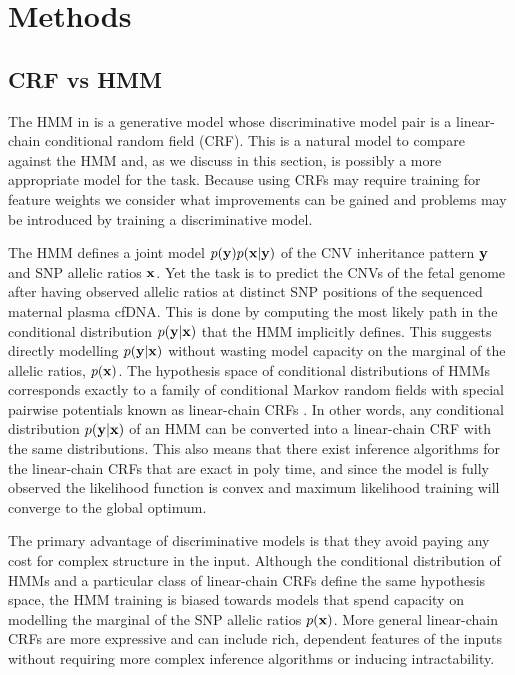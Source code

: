 \section{Methods}

\subsection{CRF vs HMM}
The HMM in \citep{rampasek2014fcnv} is a generative model whose discriminative model pair is a linear-chain conditional random field (CRF). This is a natural model to compare against the HMM and, as we discuss in this section, is possibly a more appropriate model for the task. Because using CRFs may require training for feature weights we consider what improvements can be gained and problems may be introduced by training a discriminative model.

The HMM defines a joint model $p(\mathbf{y}) p(\mathbf{x} | \mathbf{y})$ of the CNV inheritance pattern $\mathbf{y}$ and SNP allelic ratios $\mathbf{x}$. Yet the task is to predict the CNVs of the fetal genome after having observed allelic ratios at distinct SNP positions of the sequenced maternal plasma cfDNA. This is done by computing the most likely path in the conditional distribution $p(\mathbf{y} | \mathbf{x})$ that the HMM implicitly defines. This suggests directly modelling $p(\mathbf{y} | \mathbf{x})$ without wasting model capacity on the marginal of the allelic ratios, $p(\mathbf{x})$. The hypothesis space of conditional distributions of HMMs corresponds exactly to a family of conditional Markov random fields with special pairwise potentials known as linear-chain CRFs \citep{sutton2012}. In other words, any conditional distribution $p(\mathbf{y} | \mathbf{x})$ of an HMM can be converted into a linear-chain CRF with the same distributions. This also means that there exist inference algorithms for the linear-chain CRFs that are exact in poly time, and since the model is fully observed the likelihood function is convex and maximum likelihood training will converge to the global optimum.

The primary advantage of discriminative models is that they avoid paying any cost for complex structure in the input. Although the conditional distribution of HMMs and a particular class of linear-chain CRFs define the same hypothesis space, the HMM training is biased towards models that spend capacity on modelling the marginal of the SNP allelic ratios $p(\mathbf{x})$. More general linear-chain CRFs are more expressive and can include rich, dependent features of the inputs without requiring more complex inference algorithms or inducing intractability. 

